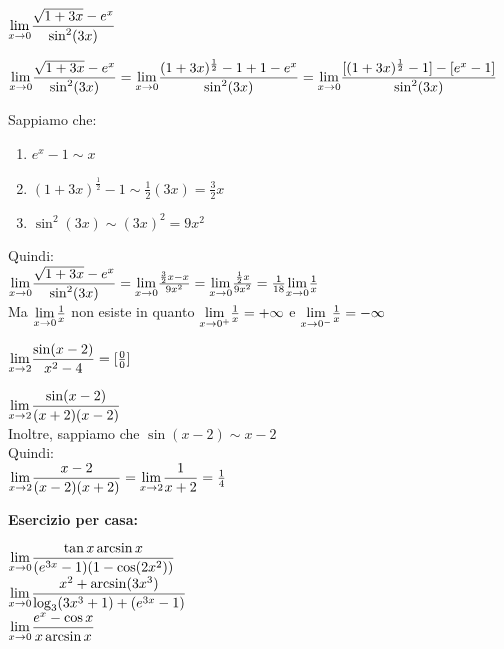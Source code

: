 \documentclass[12pt]{report}
\newcounter{exercise}
\begin{document}
 	\begin{assignment}{}{}
 		$\mathlarger{\lim_{x \to 0}}\dfrac{\sqrt{1+3x} - e^x}{\sin^2(3x)}$
 		\begin{exercise}{}{}
 			$\mathlarger{\lim_{x \to 0}}\dfrac{\sqrt{1+3x} - e^x}{\sin^2(3x)} = \mathlarger{\lim_{x \to 0}}\dfrac{(1+3x)^\frac{1}{2} -1+1 - e^x}{\sin^2(3x)} = \mathlarger{\lim_{x \to 0}}\dfrac{[(1+3x)^{\frac{1}{2}} - 1] - [e^x - 1]}{\sin^2(3x)}
 			$

 			Sappiamo che:
 			\begin{enumerate}
 				\item $e^x - 1 \sim x$
 				\item $(1 + 3x)^{\frac{1}{2}} - 1 \sim \frac{1}{2}(3x) = \frac{3}{2}x$
 				\item $\sin^2(3x) \sim (3x)^2 = 9x^2$
 			\end{enumerate}
 			Quindi: \\
 			$\mathlarger{\lim_{x \to 0}}\dfrac{\sqrt{1+3x} - e^x}{\sin^2(3x)} = \mathlarger{\lim_{x \to 0}}\frac{\frac{3}{2}x - x}{9x^2} = \mathlarger{\lim_{x \to 0}}\frac{\frac{1}{2}x}{9x^2} = \frac{1}{18}\mathlarger{\lim_{x \to 0}}\frac{1}{x}$ \\
 			Ma $\mathlarger{\lim_{x \to 0}}\frac{1}{x}$ non esiste in quanto $\mathlarger{\lim_{x \to 0^+}}\frac{1}{x}= +\infty$ e $\mathlarger{\lim_{x \to 0^-}}\frac{1}{x} = -\infty$
 		\end{exercise}
 	\end{assignment}
 	 	\begin{assignment}{}{}
 		$\mathlarger{\lim_{x \to 2}}\dfrac{\sin(x - 2)}{x^2 - 4} =[\frac{0}{0}]$
 		\begin{exercise}{}{}
 			$\mathlarger{\lim_{x \to 2}}\dfrac{\sin(x - 2)}{(x + 2)(x - 2)}$\\
 			Inoltre, sappiamo che $\sin(x -2) \sim x - 2$\\
 			Quindi: \\
 			$\mathlarger{\lim_{x \to 2}}\dfrac{x-2}{(x -2)(x + 2)} = \mathlarger{\lim_{x \to 2}}\dfrac{1}{x + 2} = \frac{1}{4}$
 		\end{exercise}
 	\end{assignment}
 	\textbf{Esercizio per casa:}
 	 	\begin{assignment}{}{}
 		$\mathlarger{\lim_{x \to 0}}\dfrac{\tan x \arcsin x}{(e^{3x} - 1)(1 - \cos(2x^2))}$
 		\\
 		$\mathlarger{\lim_{x \to 0}}\dfrac{x^2 + \arcsin(3x^3)}{\log_3(3x^3 + 1) + (e^{3x} - 1)}$ \\
 		$\mathlarger{\lim_{x \to 0}}\dfrac{e^x - \cos x}{x\arcsin x}$
 	\end{assignment}
\end{document}
